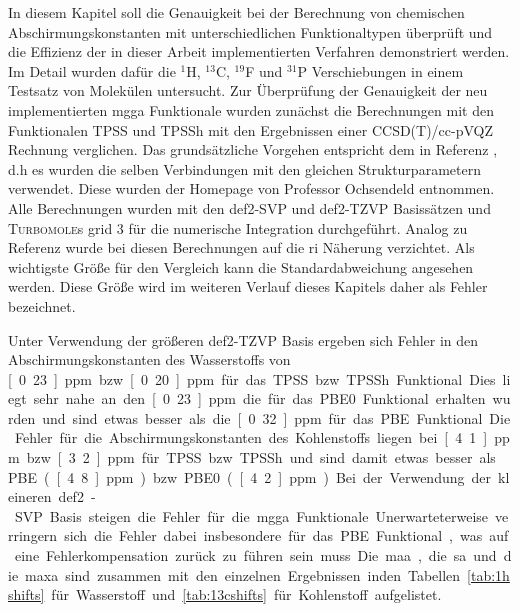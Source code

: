 In diesem Kapitel soll die Genauigkeit bei der Berechnung von chemischen Abschirmungskonstanten mit unterschiedlichen Funktionaltypen überprüft und die Effizienz der in dieser Arbeit implementierten Verfahren demonstriert werden. Im Detail wurden dafür die $^1$H, $^{13}$C, $^{19}$F und $^{31}$P Verschiebungen in einem Testsatz von Molekülen untersucht.\supercite{reiter2017calculation} Zur Überprüfung der Genauigkeit der neu implementierten \ac{mgga} Funktionale wurden zunächst die Berechnungen mit den Funktionalen TPSS und TPSSh mit den Ergebnissen einer CCSD(T)/cc-pVQZ Rechnung verglichen. Das grundsätzliche Vorgehen entspricht dem in Referenz \cite{flaig2014benchmarking}, d.h es wurden die selben Verbindungen mit den gleichen Strukturparametern verwendet. Diese wurden der Homepage von Professor Ochsendeld\supercite{ochsenfeld:structures} entnommen. Alle Berechnungen wurden mit den def2-SVP und def2-TZVP Basissätzen\supercite{weigend2005balanced} und \textsc{Turbomole}s grid 3\supercite{treutler1995efficient} für die numerische Integration durchgeführt. Analog zu Referenz \cite{ochsenfeld2004ab} wurde bei diesen Berechnungen auf die \ac{ri} Näherung verzichtet. Als wichtigste Größe für den Vergleich kann die Standardabweichung angesehen werden\supercite{flaig2014benchmarking}. Diese Größe wird im weiteren Verlauf dieses Kapitels daher als \glqq Fehler\grqq{} bezeichnet.

Unter Verwendung der größeren def2-TZVP Basis ergeben sich Fehler in den Abschirmungskonstanten des Wasserstoffs von \unit[0.23]{ppm} bzw. \unit[0.20]{ppm} für das TPSS bzw. TPSSh Funktional. Dies liegt sehr nahe an den \unit[0.23]{ppm} die für das PBE0 Funktional erhalten wurden und sind etwas besser als die \unit[0.32]{ppm} für das PBE Funktional. Die Fehler für die Abschirmungskonstanten des Kohlenstoffs liegen bei \unit[4.1]{ppm} bzw. \unit[3.2]{ppm} für TPSS bzw. TPSSh und sind damit etwas besser als PBE (\unit[4.8]{ppm}) bzw. PBE0 (\unit[4.2]{ppm}) Bei der Verwendung der kleineren def2-SVP Basis steigen die Fehler für die \ac{mgga} Funktionale. Unerwarteterweise verringern sich die Fehler dabei insbesondere für das PBE Funktional, was auf eine Fehlerkompensation zurück zu führen sein muss. Die \ac{maa}, die \ac{sa} und die \ac{maxa} sind zusammen mit den einzelnen Ergebnissen inden Tabellen \ref{tab:1hshifts} für Wasserstoff und \ref{tab:13cshifts} für Kohlenstoff aufgelistet.

